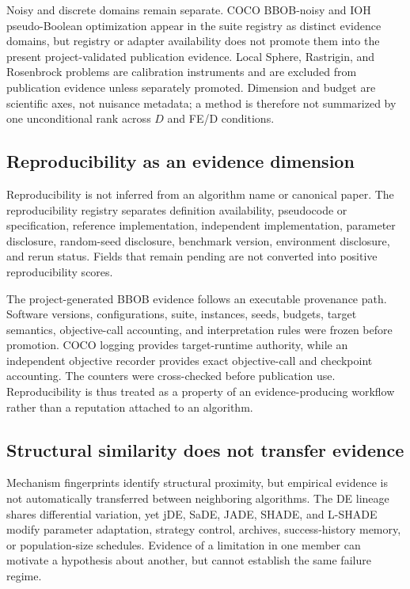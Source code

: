 Noisy and discrete domains remain separate. COCO BBOB-noisy and IOH pseudo-Boolean optimization appear in the suite registry as distinct evidence domains, but registry or adapter availability does not promote them into the present project-validated publication evidence. Local Sphere, Rastrigin, and Rosenbrock problems are calibration instruments and are excluded from publication evidence unless separately promoted. Dimension and budget are scientific axes, not nuisance metadata; a method is therefore not summarized by one unconditional rank across \(D\) and FE/D conditions.

\subsection{Reproducibility as an evidence dimension}

Reproducibility is not inferred from an algorithm name or canonical paper. The reproducibility registry separates definition availability, pseudocode or specification, reference implementation, independent implementation, parameter disclosure, random-seed disclosure, benchmark version, environment disclosure, and rerun status. Fields that remain pending are not converted into positive reproducibility scores.

The project-generated BBOB evidence follows an executable provenance path. Software versions, configurations, suite, instances, seeds, budgets, target semantics, objective-call accounting, and interpretation rules were frozen before promotion. COCO logging provides target-runtime authority, while an independent objective recorder provides exact objective-call and checkpoint accounting. The counters were cross-checked before publication use. Reproducibility is thus treated as a property of an evidence-producing workflow rather than a reputation attached to an algorithm.

\subsection{Structural similarity does not transfer evidence}

Mechanism fingerprints identify structural proximity, but empirical evidence is not automatically transferred between neighboring algorithms. The DE lineage shares differential variation, yet jDE, SaDE, JADE, SHADE, and L-SHADE modify parameter adaptation, strategy control, archives, success-history memory, or population-size schedules. Evidence of a limitation in one member can motivate a hypothesis about another, but cannot establish the same failure regime.

